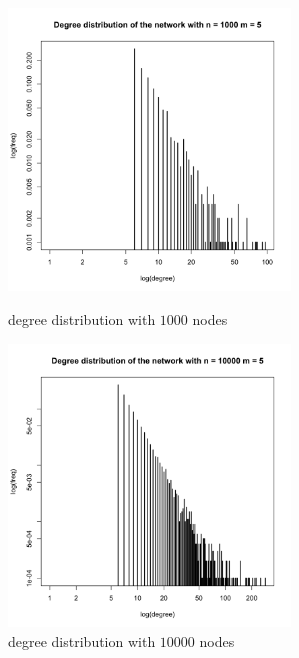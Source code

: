 \documentclass[draftcls,12pt,onecolumn]{IEEEtran}
\begin{document}
\begin{figure}[htbp]
\centering
\begin{minipage}[t]{0.48\textwidth}
\centering
\includegraphics[width=7.5cm]{img/2_g_2_degree1}
\caption{degree distribution with $1000$ nodes}
\end{minipage}
\begin{minipage}[t]{0.48\textwidth}
\centering
\includegraphics[width=7.5cm]{img/2_g_2_degree2}
\caption{degree distribution with $10000$ nodes}
\end{minipage}
\end{figure}
\end{document}
